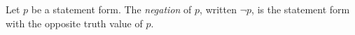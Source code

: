 \guard





\begin{defn}
\label{defn:negationOfStatement}
  Let $p$ be a statement form.
  The \emph{negation} of $p$, written $\neg p$, is the statement form with the opposite truth value of $p$.
\end{defn}
